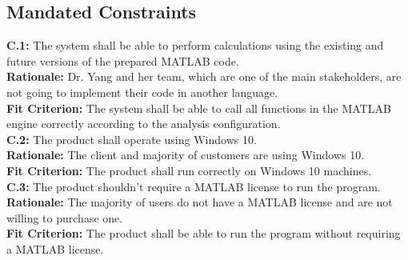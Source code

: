 \documentclass[12pt]{article}
\begin{document}
\subsection{Mandated Constraints}
    \hspace{5mm} \textbf{C.1:} The system shall be able to perform calculations using the existing and future versions of the prepared MATLAB code. \\
    \textbf{Rationale:} Dr. Yang and her team, which are one of the main stakeholders, are not going to implement their code in another language.\\
    \textbf{Fit Criterion:} The system shall be able to call all functions in the MATLAB engine correctly according to the analysis configuration.\\
    \textbf{C.2:} The product shall operate using Windows 10. \\
    \textbf{Rationale:} The client and majority of customers are using Windows 10.\\
    \textbf{Fit Criterion:} The product shall run correctly on Windows 10 machines.\\
    \textbf{C.3:} The product shouldn't require a MATLAB license to run the program. \\
    \textbf{Rationale:} The majority of users do not have a MATLAB license and are not willing to purchase one.\\
    \textbf{Fit Criterion:} The product shall be able to run the program without requiring a MATLAB license.\\\\
\end{document}
